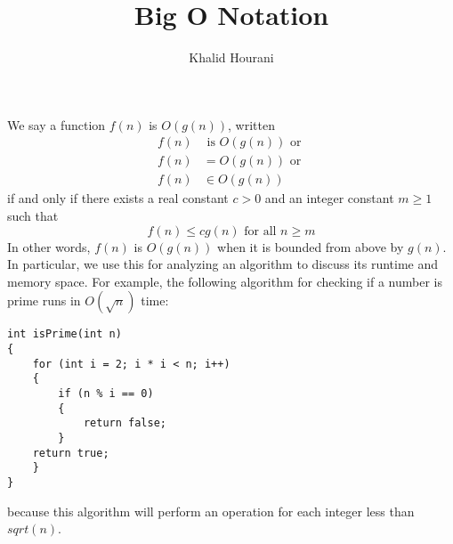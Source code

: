 \documentclass[a4paper]{article}
\title{Big O Notation}
\author{Khalid Hourani}
\begin{document}
\maketitle

We say a function $f(n)$ is $O(g(n))$, written \begin{align*}f(n) &\text{ is } O(g(n))\text{ or }\\f(n)&=O(g(n))\text{ or }\\f(n)&\in O(g(n))\end{align*} if and only if there exists a real constant $c>0$ and an integer constant $m\geq1$ such that \[f(n)\leq cg(n) \text{ for all }n\geq m\] In other words, $f(n)$ is $O(g(n))$ when it is bounded from above by $g(n)$. In particular, we use this for analyzing an algorithm to discuss its runtime and memory space. For example, the following algorithm for checking if a number is prime runs in $O(\sqrt{n})$ time:

\begin{verbatim}
int isPrime(int n)
{
	for (int i = 2; i * i < n; i++)
	{
		if (n % i == 0)
		{
			return false;
		}
	return true;
	}
}
\end{verbatim}

because this algorithm will perform an operation for each integer less than $sqrt(n)$. 
\end{document}
